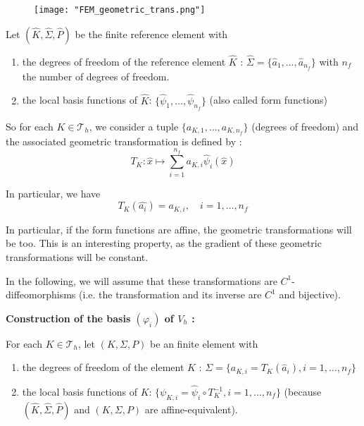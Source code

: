 \begin{figure}[H]
	\centering
	\texttt{[image: "FEM\_geometric\_trans.png"]}
	\label{trans_geo}
\end{figure}

Let $(\hat{K},\hat{\Sigma},\hat{P})$ be the finite reference element with 
\begin{enumerate}[label=\textbullet]
	\item the degrees of freedom of the reference element $\hat{K}$ : $\hat{\Sigma}=\{\hat{a}_1,\dots,\hat{a}_{n_f}\}$ with $n_f$ the number of degrees of freedom.
	\item the local basis functions of $\hat{K}$: $\{\hat{\psi}_1,\dots,\hat{\psi}_{n_f}\}$ (also called form functions)
\end{enumerate}

So for each $K\in\mathcal{T}_h$, we consider a tuple $\{a_{K,1},\dots,a_{K,n_f}\}$ (degrees of freedom) and the associated geometric transformation is defined by :
\begin{equation*}
	T_K : \hat{x}\mapsto\sum_{i=1}^{n_f}a_{K,i}\hat{\psi}_i(\hat{x})
\end{equation*}

In particular, we have
\begin{equation*}
	T_K(\hat{a_i})=a_{K,i}, \quad i=1,\dots,n_f
\end{equation*}

\begin{Rem}
	In particular, if the form functions are affine, the geometric transformations will be too. This is an interesting property, as the gradient of these geometric transformations will be constant.
\end{Rem}

\begin{Rem}
	In the following, we will assume that these transformations are $C^1$-diffeomorphisms (i.e. the transformation and its inverse are $C^1$ and bijective).
\end{Rem}

\textbf{Construction of the basis $(\varphi_i)$ of $V_h$ :}

For each $K\in\mathcal{T}_h$, let $(K,\Sigma,P)$ be an finite element with 
\begin{enumerate}[label=\textbullet]
	\item the degrees of freedom of the element $K$ : $\Sigma=\{a_{K,i}=T_K(\hat{a}_i), i=1,\dots,n_f\}$
	\item the local basis functions of $K$: $\{\psi_{K,i}=\hat{\psi}_i\circ T_K^{-1}, i=1,\dots,n_f\}$ (because $(\hat{K},\hat{\Sigma},\hat{P})$ and $(K,\Sigma,P)$ are affine-equivalent).
\end{enumerate}

